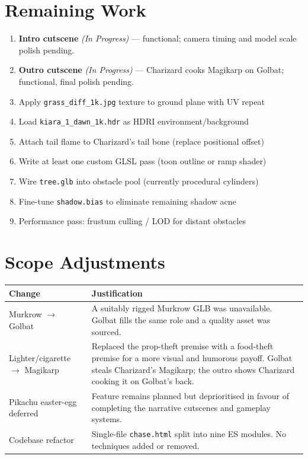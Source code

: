 \documentclass[11pt,a4paper]{article}
\begin{document}
\section{Remaining Work}

\begin{enumerate}[leftmargin=*, label=\arabic*.]
    \item \textbf{Intro cutscene} \textit{(In Progress)} --- functional; camera
          timing and model scale polish pending.
    \item \textbf{Outro cutscene} \textit{(In Progress)} --- Charizard cooks
          Magikarp on Golbat; functional, final polish pending.
    \item Apply \texttt{grass\_diff\_1k.jpg} texture to ground plane with UV repeat
    \item Load \texttt{kiara\_1\_dawn\_1k.hdr} as HDRI environment/background
    \item Attach tail flame to Charizard's tail bone (replace positional offset)
    \item Write at least one custom GLSL pass (toon outline or ramp shader)
    \item Wire \texttt{tree.glb} into obstacle pool (currently procedural cylinders)
    \item Fine-tune \texttt{shadow.bias} to eliminate remaining shadow acne
    \item Performance pass: frustum culling / LOD for distant obstacles
\end{enumerate}

\section{Scope Adjustments}

\begin{tabular}{@{} L{4cm} L{10cm} @{}}
\toprule
\textbf{Change} & \textbf{Justification} \\
\midrule
Murkrow \(\rightarrow\) Golbat
  & A suitably rigged Murkrow GLB was unavailable. Golbat fills the same
    role and a quality asset was sourced. \\[4pt]
Lighter/cigarette \(\rightarrow\) Magikarp
  & Replaced the prop-theft premise with a food-theft premise for a more
    visual and humorous payoff. Golbat steals Charizard's Magikarp; the
    outro shows Charizard cooking it on Golbat's back. \\[4pt]
Pikachu easter-egg deferred
  & Feature remains planned but deprioritised in favour of completing the
    narrative cutscenes and gameplay systems. \\[4pt]
Codebase refactor
  & Single-file \texttt{chase.html} split into nine ES modules. No
    techniques added or removed. \\
\bottomrule
\end{tabular}
\end{document}
